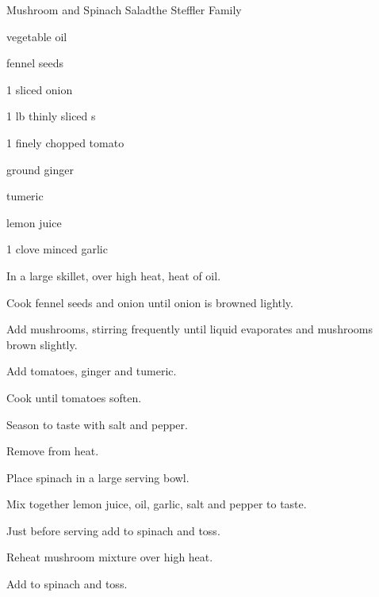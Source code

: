 \begin{recipe}{Mushroom and Spinach Salad}{the Steffler Family}{}

\begin{ingredients}
\item {} vegetable oil
\item {} fennel seeds
\item 1 sliced onion
\item 1 lb thinly sliced s
\item 1 finely chopped tomato
\item \tp{\half} ground ginger
\item \tp{\quarter} tumeric
\item {} lemon juice
\item 1 clove minced garlic
\item {} 
\end{ingredients}

\begin{directions}
\item In a large skillet, over high heat, heat  of oil.
\item Cook fennel seeds and onion until onion is browned lightly.
\item Add mushrooms, stirring frequently until liquid evaporates and mushrooms brown slightly.
\item Add tomatoes, ginger and tumeric.
\item Cook until tomatoes soften.
\item Season to taste with salt and pepper.
\item Remove from heat.
\item Place spinach in a large serving bowl.
\item Mix together lemon juice, oil, garlic, salt and pepper to taste.
\item Just before serving add to spinach and toss.
\item Reheat mushroom mixture over high heat.
\item Add to spinach and toss.
\end{directions}
\end{recipe}
